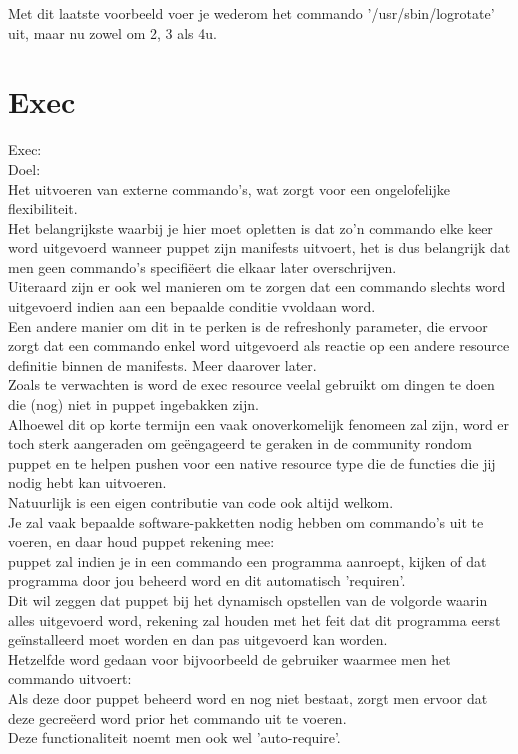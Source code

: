 	Met dit laatste voorbeeld voer je wederom het commando '/usr/sbin/logrotate' uit, maar nu zowel om 2, 3 als 4u.\\

\section{Exec}
Exec:\\
Doel:\\
	Het uitvoeren van externe commando's, wat zorgt voor een ongelofelijke flexibiliteit.\\
	Het belangrijkste waarbij je hier moet opletten is dat zo'n commando elke keer word uitgevoerd wanneer puppet zijn manifests uitvoert, het is dus belangrijk dat men geen commando's specifiëert die elkaar later overschrijven.\\
	Uiteraard zijn er ook wel manieren om te zorgen dat een commando slechts word uitgevoerd indien aan een bepaalde conditie vvoldaan word.\\
	Een andere manier om dit in te perken is de refreshonly parameter, die ervoor zorgt dat een commando enkel word uitgevoerd als reactie op een andere resource definitie binnen de manifests. Meer daarover later.\\

	Zoals te verwachten is word de exec resource veelal gebruikt om dingen te doen die (nog) niet in puppet ingebakken zijn.\\
	Alhoewel dit op korte termijn een vaak onoverkomelijk fenomeen zal zijn, word er toch sterk aangeraden om geëngageerd te geraken in de community rondom puppet en te helpen pushen voor een native resource type die de functies die jij nodig hebt kan uitvoeren.\\
	Natuurlijk is een eigen contributie van code ook altijd welkom.\\

	Je zal vaak bepaalde software-pakketten nodig hebben om commando's uit te voeren, en daar houd puppet rekening mee:\\
	puppet zal indien je in een commando een programma aanroept, kijken of dat programma door jou beheerd word en dit automatisch 'requiren'.\\
	Dit wil zeggen dat puppet bij het dynamisch opstellen van de volgorde waarin alles uitgevoerd word, rekening zal houden met het feit dat dit programma eerst geïnstalleerd moet worden en dan pas uitgevoerd kan worden.\\
	Hetzelfde word gedaan voor bijvoorbeeld de gebruiker waarmee men het commando uitvoert:\\
	Als deze door puppet beheerd word en nog niet bestaat, zorgt men ervoor dat deze gecreëerd word prior het commando uit te voeren.\\
	Deze functionaliteit noemt men ook wel 'auto-require'.\\

